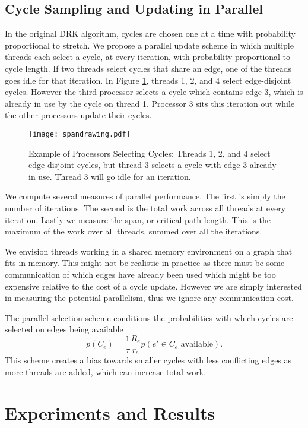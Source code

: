 \documentclass{sig-alternate}
\begin{document}
\subsection{Cycle Sampling and Updating in Parallel}
In the original DRK algorithm, cycles are chosen one at a time with
probability proportional to stretch.
We propose a parallel update scheme
in which multiple threads each select a cycle,
at every iteration, with
probability proportional to cycle length. If two threads
select cycles that share an edge, one of the threads goes idle for that
iteration. In Figure \ref{parallelcycle}, threads 1, 2, and 4 select
edge-disjoint cycles.
However the third processor selects a cycle which contains edge 3,
which is already in use by the cycle on thread 1. Processor 3 sits this
iteration out while the other processors update their cycles.



\begin{figure}[h]
\centering
\texttt{[image: spandrawing.pdf]}
\caption{Example of Processors Selecting Cycles: Threads 1, 2, and 4 select
edge-disjoint cycles, but thread 3 selects a cycle with edge 3 already in use.
Thread 3 will go idle for an iteration.}
\label{parallelcycle}
\end{figure}

We compute several measures of parallel performance.
The first is simply the number of iterations. The second is the total work
across all threads at every iteration. Lastly we measure the span,
or critical path length. This is the maximum of the work over all threads,
summed over all the iterations.

We envision threads working in a shared memory environment on a graph
that fits in memory.
This might not be realistic in practice as there must be some communication of
which edges have already been used which might be too expensive relative to the
cost of a cycle
update. However we are simply interested in measuring
the potential parallelism, thus we ignore any communication cost.

The parallel selection scheme conditions
the probabilities with which cycles are selected on
edges being available
\[
p(C_e) = \frac{1}{\tau}\frac{R_e}{r_e} p(e' \in C_e \text{ available}).
\]
This scheme creates a bias
towards smaller cycles with less conflicting
edges as more threads are added, which can increase total work.


\newpage
\section{Experiments and Results}
\end{document}
